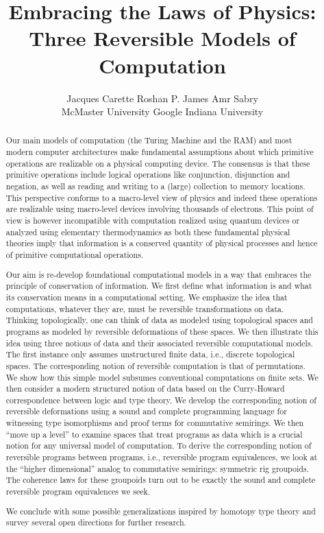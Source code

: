 \documentclass{article}
\title{Embracing the Laws of Physics: \\ Three Reversible Models of Computation}
\author{Jacques Carette \qquad\qquad Roshan P. James \qquad\qquad Amr Sabry \\
McMaster University \qquad\qquad Google \qquad\qquad Indiana University}
\begin{document}
\maketitle 

\begin{abstract}
  Our main models of computation (the Turing Machine and the RAM) and
  most modern computer architectures make fundamental assumptions
  about which primitive operations are realizable on a physical
  computing device. The consensus is that these primitive operations
  include logical operations like conjunction, disjunction and
  negation, as well as reading and writing to a (large) collection to
  memory locations. This perspective conforms to a macro-level view of
  physics and indeed these operations are realizable using macro-level
  devices involving thousands of electrons. This point of view is
  however incompatible with computation realized using quantum devices
  or analyzed using elementary thermodynamics as both these
  fundamental physical theories imply that information is a conserved
  quantity of physical processes and hence of primitive computational
  operations.

  Our aim is re-develop foundational computational models in a way
  that embraces the principle of conservation of information. We first
  define what information is and what its conservation means in a
  computational setting. We emphasize the idea that computations,
  whatever they are, must be reversible transformations on
  data. Thinking topologically, one can think of data as modeled using
  topological spaces and programs as modeled by reversible
  deformations of these spaces. We then illustrate this idea using
  three notions of data and their associated reversible computational
  models. The first instance only assumes unstructured finite data,
  i.e., discrete topological spaces. The corresponding notion of
  reversible computation is that of permutations. We show how this
  simple model subsumes conventional computations on finite sets. We
  then consider a modern structured notion of data based on the
  Curry-Howard correspondence between logic and type theory. We
  develop the corresponding notion of reversible deformations using a
  sound and complete programming language for witnessing type
  isomorphisms and proof terms for commutative semirings.  We then
  ``move up a level'' to examine spaces that treat programs as data
  which is a crucial notion for any universal model of computation. To
  derive the corresponding notion of reversible programs between
  programs, i.e., reversible program equivalences, we look at the
  ``higher dimensional'' analog to commutative semirings: symmetric
  rig groupoids. The coherence laws for these groupoids turn out to be
  exactly the sound and complete reversible program equivalences we
  seek.
 
  We conclude with some possible generalizations inspired by homotopy
  type theory and survey several open directions for further research.

\end{abstract}
\end{document}
